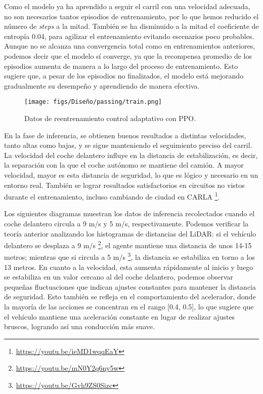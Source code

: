 \newpage

Como el modelo ya ha aprendido a seguir el carril con una velocidad adecuada, no son necesarios tantos episodios de entrenamiento, por lo que hemos reducido el número de \textit{steps} a la mitad. También se ha disminuido a la mitad el coeficiente de entropía 0.04, para agilizar el entrenamiento evitando escenarios poco probables. Aunque no se alcanza una convergencia total como en entrenamientos anteriores, podemos decir que el modelo sí converge, ya que la recompensa promedio de los episodios aumenta de manera a lo largo del proceso de entrenamiento. Esto sugiere que, a pesar de los episodios no finalizados, el modelo está mejorando gradualmente su desempeño y aprendiendo de manera efectiva. 
\begin{figure}[ht]
  \centering
  \texttt{[image: figs/Diseño/passing/train.png]}
  \caption{Datos de reentrenamiento control adaptativo con \ac{PPO}.}
  \label{fig:velocities}
\end{figure}

En la fase de inferencia, se obtienen buenos resultados a distintas velocidades, tanto altas como bajas, y se sigue manteniendo el seguimiento preciso del carril. La velocidad del coche delantero influye en la distancia de estabilización, es decir, la separación con la que el coche autónomo se mantiene del camión. A mayor velocidad, mayor es esta distancia de seguridad, lo que es lógico y necesario en un entorno real. También se lograr resultados satisfactorios en circuitos no vistos durante el entrenamiento, incluso cambiando de ciudad en CARLA \footnote{\url{https://youtu.be/ieMD1wqqEaY}}. 

Los siguientes diagramas muestran los datos de inferencia recolectados cuando el coche delantero circula a 9 m/s y 5 m/s, respectivamente. Podemos verificar la teoría anterior analizando los histogramas de distancias del \ac{LiDAR}: si el vehículo delantero se desplaza a 9 m/s \footnote{\url{https://youtu.be/mN0Y2q6ny5w}}, el agente mantiene una distancia de unos 14-15 metros; mientras que si circula a 5 m/s \footnote{\url{https://youtu.be/Gvh9ZS0Sizc}}, la distancia se estabiliza en torno a los 13 metros. En cuanto a la velocidad, esta aumenta rápidamente al inicio y luego se estabiliza en un valor cercano al del coche delantero, podemos observar pequeñas fluctuaciones que indican ajustes constantes para mantener la distancia de seguridad. Esto también se refleja en el comportamiento del acelerador, donde la mayoría de las acciones se concentran en el rango [0.4, 0.5], lo que sugiere que el vehículo mantiene una aceleración constante en lugar de realizar ajustes bruscos, logrando así una conducción más suave.

